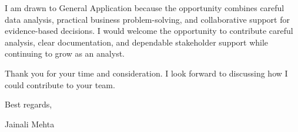 \documentclass[letterpaper,11pt]{article}
\begin{document}
\bigbreak
I am drawn to General Application because the opportunity combines careful data analysis, practical business problem-solving, and collaborative support for evidence-based decisions. I would welcome the opportunity to contribute careful analysis, clear documentation, and dependable stakeholder support while continuing to grow as an analyst.

\bigbreak
Thank you for your time and consideration. I look forward to discussing how I could contribute to your team.

\bigbreak
Best regards,

\bigbreak
Jainali Mehta
\end{document}
